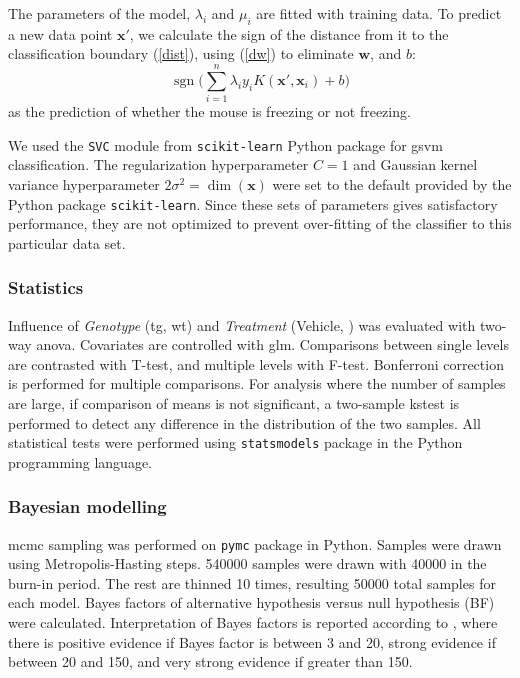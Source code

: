 The parameters of the model, $\lambda_i$ and $\mu_i$ are fitted with training data. To predict a new data point $\mathbf{x}'$, we calculate the sign of the distance from it to the classification boundary (\ref{dist}), using (\ref{dw}) to eliminate $\mathbf{w}$, and $b$:
\begin{equation*}
    \operatorname{sgn}\Big(\sum_{i=1}^n\lambda_iy_iK(\mathbf{x}', \mathbf{x}_i) + b\Big)
\end{equation*}
as the prediction of whether the mouse is freezing or not freezing.

We used the \texttt{SVC} module from \texttt{scikit-learn} Python package for \gls{gsvm} classification. The regularization hyperparameter $C=1$ and Gaussian kernel variance hyperparameter $2\sigma^2=\operatorname{dim}(\mathbf{x})$ were set to the default provided by the Python package \texttt{scikit-learn}. Since these sets of parameters gives satisfactory performance, they are not optimized to prevent over-fitting of the classifier to this particular data set.



\subsubsection{Statistics}

Influence of \textit{Genotype} (\gls{tg}, \gls{wt}) and \textit{Treatment} (Vehicle, \tglu{}) was evaluated with two-way \gls{anova}. Covariates are controlled with \gls{glm}. Comparisons between single levels are contrasted with T-test, and multiple levels with F-test. Bonferroni correction is performed for multiple comparisons. For analysis where the number of samples are large, if comparison of means is not significant, a two-sample \gls{kstest} is performed to detect any difference in the distribution of the two samples. All statistical tests were performed using \texttt{statsmodels} package in the Python programming language.

\subsubsection{Bayesian modelling}
\Gls{mcmc} sampling was performed on \texttt{pymc} package in Python. Samples were drawn using Metropolis-Hasting steps. \num{540000} samples were drawn with \num{40000} in the burn-in period. The rest are thinned \num{10} times, resulting \num{50000} total samples for each model. Bayes factors of alternative hypothesis versus null hypothesis (BF) were calculated. Interpretation of Bayes factors is reported according to \citet{kass95}, where there is positive evidence if Bayes factor is between 3 and 20, strong evidence if between 20 and 150, and very strong evidence if greater than 150.

